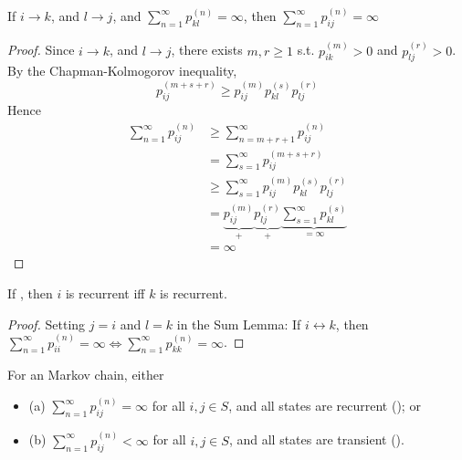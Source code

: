 \documentclass[11pt]{article}
\newcommand{\dur}[3]{{#1}_{#2}^{({#3})}}
\begin{document}
    If $i \rightarrow k$, and $l \rightarrow j$, and $\sum_{n=1}^\infty p_{kl}^{(n)} = \infty$, then $\sum_{n=1}^\infty p_{ij}^{(n)} = \infty$
    \begin{proof}
    	Since $i \rightarrow k$, and $l \rightarrow j$, there exists $m, r \geq 1$ s.t. $\dur{p}{ik}{m} > 0$ and $\dur{p}{lj}{r} > 0$. \\
    	By the Chapman-Kolmogorov inequality, $$\dur{p}{ij}{m+s+r} \geq \dur{p}{ij}{m}\dur{p}{kl}{s}\dur{p}{lj}{r}$$
    	Hence
    	\begin{align*}
    		\sum_{n=1}^{\infty} \dur{p}{ij}{n} &\geq \sum_{n = m + r + 1}^{\infty} \dur{p}{ij}{n} \\
    		&= \sum_{s=1}^\infty \dur{p}{ij}{m + s + r} \tag{$s = n - m -r$}\\
    		&\geq \sum_{s=1}^\infty \dur{p}{ij}{m}\dur{p}{kl}{s}\dur{p}{lj}{r} \\
    		&= \underbrace{\dur{p}{ij}{m}}_{+}\underbrace{\dur{p}{lj}{r}}_{+}\underbrace{\sum_{s=1}^{\infty}\dur{p}{kl}{s}}_{=\infty}\\
    		&= \infty
    	\end{align*}

    \end{proof}
     If , then $i$ is recurrent iff $k$ is recurrent.
    \begin{proof}
    	Setting $j = i$ and $l = k$ in the Sum Lemma: If $i \leftrightarrow k$, then $\sum_{n=1}^\infty \dur{p}{ii}{n} = \infty \iff \sum_{n=1}^\infty \dur{p}{kk}{n} = \infty$.
    \end{proof}
    
    For an  Markov chain, either
    \begin{itemize}
    	\item (a) $\sum_{n=1}^\infty p_{ij}^{(n)} = \infty$ for all $i, j \in S$, and all states are recurrent (); or
    	\item (b) $\sum_{n=1}^\infty p_{ij}^{(n)} < \infty$ for all $i, j \in S$, and all states are transient ().
    \end{itemize}
    
\end{document}
